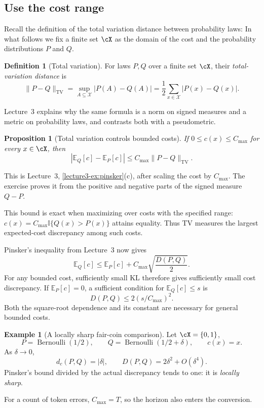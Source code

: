 \documentclass[11pt,twoside]{article}
\newcommand{\E}{\mathbb E}
\newcommand{\I}{\mathbb I}
\newcommand{\KL}{D}
\newcommand{\tv}[1]{\lVert #1\rVert_{\mathrm{TV}}}
\newtheorem{proposition}[theorem]{Proposition}
\theoremstyle{definition}
\newtheorem{definition}[theorem]{Definition}
\newtheorem{example}[theorem]{Example}
\theoremstyle{remark}
\begin{document}
\subsection{Use the cost range}

Recall the definition of the total variation distance between probability laws:
In what follows we fix a finite set $\cX$ as the domain of the cost and the probability distributions $P$ and $Q$.
\begin{definition}[Total variation]
For laws \(P,Q\) over a finite set $\cX$, their
\emph{total-variation distance} is
\begin{equation}
  \tv{P-Q}
  =\sup_{A\subseteq\mathcal X}|P(A)-Q(A)|
  =\frac12\sum_{x\in\mathcal X}|P(x)-Q(x)|.
  \label{eq:tv}
\end{equation}
\end{definition}
Lecture~3 explains why the same formula is a norm on signed measures and a
metric on probability laws, and contrasts both with a pseudometric.
\begin{proposition}[Total variation controls bounded costs]
\label{prop:tv-cost}
If \(0\le c(x)\le C_{\max}\) for every \(x\in \cX\), then
\begin{equation}
  |\E_Q[c]-\E_P[c]|
  \le C_{\max}\tv{P-Q}.
  \label{eq:tv-cost}
\end{equation}
\end{proposition}

This is Lecture~3, \cref{lecture3-ex:pinsker}(c), after scaling the cost by
\(C_{\max}\). The exercise proves it from the positive and negative parts of
the signed measure \(Q-P\).

This bound is exact when maximizing over costs with the specified range:
\(c(x)=C_{\max}\I\{Q(x)>P(x)\}\) attains equality.
Thus TV measures the largest expected-cost discrepancy among such costs.

Pinsker's inequality from Lecture~3 now gives
\begin{equation}
  \E_Q[c]\le
  \E_P[c]+C_{\max}\sqrt{\frac{\KL(P, Q)}2}.
  \label{eq:pinsker-cost}
\end{equation}
For any bounded cost, sufficiently small KL therefore
gives sufficiently small cost discrepancy.
If \(\E_P[c]=0\), a sufficient condition for
\(\E_Q[c]\le s\) is
\[
  \KL(P, Q)\le 2(s/C_{\max})^2.
\]
Both the square-root dependence and its constant are necessary for
general bounded costs.
\begin{example}[A locally sharp fair-coin comparison]
\label{exmp:fair-coin}
Let $\cX=\{0,1\}$,
\[
 P=\operatorname{Bernoulli}(1/2),\qquad
 Q=\operatorname{Bernoulli}(1/2+\delta),\qquad c(x)=x.
\]
As \(\delta\to0\),
\[
 d_c(P,Q)=|\delta|,\qquad
 \KL(P, Q)=2\delta^2+O(\delta^4).
\]
Pinsker's bound divided by the actual discrepancy tends to one: it is
\emph{locally sharp}.
\end{example}
For a count of token errors, \(C_{\max}=T\),
so the horizon also enters the conversion.
\end{document}
